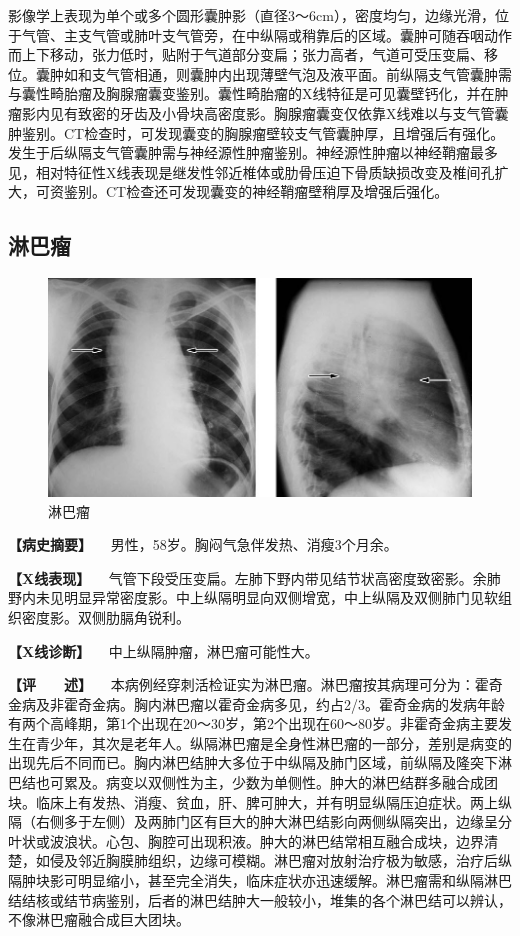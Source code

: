 影像学上表现为单个或多个圆形囊肿影（直径3～6cm），密度均匀，边缘光滑，位于气管、主支气管或肺叶支气管旁，在中纵隔或稍靠后的区域。囊肿可随吞咽动作而上下移动，张力低时，贴附于气道部分变扁；张力高者，气道可受压变扁、移位。囊肿如和支气管相通，则囊肿内出现薄壁气泡及液平面。前纵隔支气管囊肿需与囊性畸胎瘤及胸腺瘤囊变鉴别。囊性畸胎瘤的X线特征是可见囊壁钙化，并在肿瘤影内见有致密的牙齿及小骨块高密度影。胸腺瘤囊变仅依靠X线难以与支气管囊肿鉴别。CT检查时，可发现囊变的胸腺瘤壁较支气管囊肿厚，且增强后有强化。发生于后纵隔支气管囊肿需与神经源性肿瘤鉴别。神经源性肿瘤以神经鞘瘤最多见，相对特征性X线表现是继发性邻近椎体或肋骨压迫下骨质缺损改变及椎间孔扩大，可资鉴别。CT检查还可发现囊变的神经鞘瘤壁稍厚及增强后强化。

\subsection{淋巴瘤}

\begin{figure}[!htbp]
 \centering
 \includegraphics{./images/Image00198.jpg}
 \captionsetup{justification=centering}
 \caption{淋巴瘤}
 \label{fig3-12-5}
  \end{figure} 

\textbf{【病史摘要】} 　男性，58岁。胸闷气急伴发热、消瘦3个月余。

\textbf{【X线表现】}
　气管下段受压变扁。左肺下野内带见结节状高密度致密影。余肺野内未见明显异常密度影。中上纵隔明显向双侧增宽，中上纵隔及双侧肺门见软组织密度影。双侧肋膈角锐利。

\textbf{【X线诊断】} 　中上纵隔肿瘤，淋巴瘤可能性大。

\textbf{【评　　述】}
　本病例经穿刺活检证实为淋巴瘤。淋巴瘤按其病理可分为：霍奇金病及非霍奇金病。胸内淋巴瘤以霍奇金病多见，约占2/3。霍奇金病的发病年龄有两个高峰期，第1个出现在20～30岁，第2个出现在60～80岁。非霍奇金病主要发生在青少年，其次是老年人。纵隔淋巴瘤是全身性淋巴瘤的一部分，差别是病变的出现先后不同而已。胸内淋巴结肿大多位于中纵隔及肺门区域，前纵隔及隆突下淋巴结也可累及。病变以双侧性为主，少数为单侧性。肿大的淋巴结群多融合成团块。临床上有发热、消瘦、贫血，肝、脾可肿大，并有明显纵隔压迫症状。两上纵隔（右侧多于左侧）及两肺门区有巨大的肿大淋巴结影向两侧纵隔突出，边缘呈分叶状或波浪状。心包、胸腔可出现积液。肿大的淋巴结常相互融合成块，边界清楚，如侵及邻近胸膜肺组织，边缘可模糊。淋巴瘤对放射治疗极为敏感，治疗后纵隔肿块影可明显缩小，甚至完全消失，临床症状亦迅速缓解。淋巴瘤需和纵隔淋巴结结核或结节病鉴别，后者的淋巴结肿大一般较小，堆集的各个淋巴结可以辨认，不像淋巴瘤融合成巨大团块。

